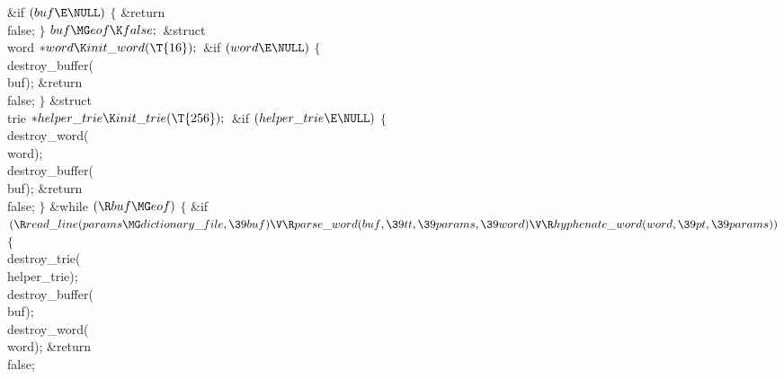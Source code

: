 \&{if} ${}(\\{buf}\E\NULL){}$\5
${}\{{}$\1\6
\&{return} \\{false};\6
\4${}\}{}$\2\6
${}\\{buf}\MG\\{eof}\K\\{false};{}$\7
\&{struct} \\{word} ${}{*}\\{word}\K\\{init\_word}(\T{16});{}$\7
\&{if} ${}(\\{word}\E\NULL){}$\5
${}\{{}$\1\6
\\{destroy\_buffer}(\\{buf});\6
\&{return} \\{false};\6
\4${}\}{}$\2\7
\&{struct} \\{trie} ${}{*}\\{helper\_trie}\K\\{init\_trie}(\T{256});{}$\7
\&{if} ${}(\\{helper\_trie}\E\NULL){}$\5
${}\{{}$\1\6
\\{destroy\_word}(\\{word});\6
\\{destroy\_buffer}(\\{buf});\6
\&{return} \\{false};\6
\4${}\}{}$\2\6
\&{while} ${}(\R\\{buf}\MG\\{eof}){}$\5
${}\{{}$\1\6
\&{if} ${}(\R\\{read\_line}(\\{params}\MG\\{dictionary\_file},\39\\{buf})\V\R%
\\{parse\_word}(\\{buf},\39\\{tt},\39\\{params},\39\\{word})\V\R\\{hyphenate%
\_word}(\\{word},\39\\{pt},\39\\{params})){}$\5
${}\{{}$\1\6
\\{destroy\_trie}(\\{helper\_trie});\6
\\{destroy\_buffer}(\\{buf});\6
\\{destroy\_word}(\\{word});\6
\&{return} \\{false};\6
